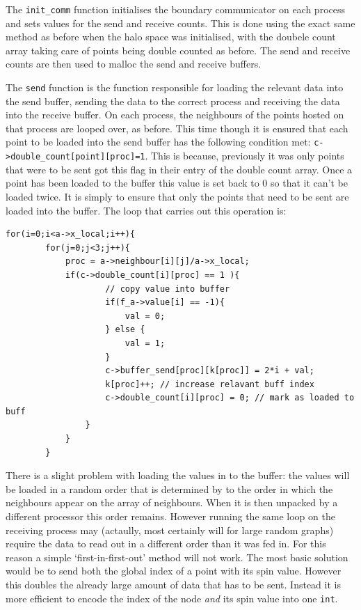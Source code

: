 \documentclass[pdftex,12pt,a4paper]{article}
\begin{document}
The \verb|init_comm| function initialises the boundary communicator on each process and sets values for the send and receive counts. This is done using the exact same method as before when the halo space was initialised, with the doubele count array taking care of points being double counted as before. The send and receive counts are then used to malloc the send and receive buffers.

The \verb|send| function is the function responsible for loading the relevant data into the send buffer, sending the data to the correct process and receiving the data into the receive buffer. On each process, the neighbours of the points hosted on that process are looped over, as before. This time though it is ensured that each point to be loaded into the send buffer has the following condition met: \verb|c->double_count[point][proc]=1|. This is because, previously it was only points that were to be sent got this flag in their entry of the double count array. Once a point has been loaded to the buffer this value is set back to 0 so that it can't be loaded twice. It is simply to ensure that only the points that need to be sent are loaded into the buffer. The loop that carries out this operation is:

\begin{lstlisting}
for(i=0;i<a->x_local;i++){
		for(j=0;j<3;j++){
			proc = a->neighbour[i][j]/a->x_local;
			if(c->double_count[i][proc] == 1 ){
					// copy value into buffer
					if(f_a->value[i] == -1){
						val = 0;
					} else {
						val = 1;
					}
					c->buffer_send[proc][k[proc]] = 2*i + val;
					k[proc]++; // increase relavant buff index
					c->double_count[i][proc] = 0; // mark as loaded to buff
				}
			}
		}
\end{lstlisting} 

There is a slight problem with loading the values in to the buffer: the values will be loaded in a random order that is determined by to the order in which the neighbours appear on the array of neighbours. When it is then unpacked by a different processor this order remains. However running the same loop on the receiving process may (actaully, most certainly will for large random graphs) require the data to read out in a different order than it was fed in. For this reason a simple `first-in-first-out' method will not work. The most basic solution would be to send both the global index of a point with its spin value. However this doubles the already large amount of data that has to be sent. Instead it is more efficient to encode the index of the node \emph{and} its spin value into one \verb|int|.
\end{document}
